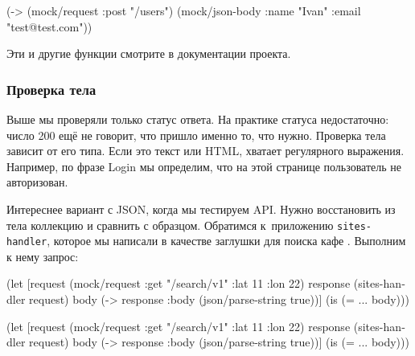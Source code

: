 \else

\begin{english}
  \begin{clojure}
(-> (mock/request :post "/users")
    (mock/json-body {:name "Ivan" :email "test@test.com"}))
  \end{clojure}
\end{english}

\fi

\noindent
Эти и другие функции смотрите в документации проекта.

\subsubsection*{Проверка тела}

Выше мы проверяли только статус ответа. На практике статуса недостаточно: число
200 ещё не говорит, что пришло именно то, что нужно. Проверка тела зависит от
его типа. Если это текст или HTML, хватает регулярного выражения. Например, по
фразе Login мы определим, что на этой странице пользователь не авторизован.


Интереснее вариант с JSON, когда мы тестируем API. Нужно восстановить из тела
коллекцию и сравнить с образцом. Обратимся к~приложению \verb|sites-handler|,
которое мы написали в качестве заглушки для поиска кафе .
Выполним к нему запрос:

\ifx\devicetype\mobile

\begin{english}
  \begin{clojure}
(let [request (mock/request
                :get "/search/v1"
                {:lat 11 :lon 22})
      response (sites-handler request)
      body (-> response
               :body
               (json/parse-string
                 true))]
  (is (= {...} body)))
  \end{clojure}
\end{english}

\else

\begin{english}
  \begin{clojure}
(let [request (mock/request :get "/search/v1"
                            {:lat 11 :lon 22})
      response (sites-handler request)
      body (-> response :body (json/parse-string true))]
  (is (= {...} body)))
  \end{clojure}
\end{english}

